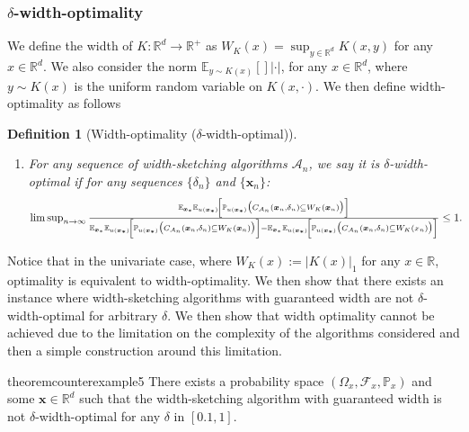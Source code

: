 \documentclass{article} %
\newtheorem{definition}{Definition}[section]
\theoremstyle{remark}
\theoremstyle{definition}      %
\begin{document}
\subsubsection{$\delta$-width-optimality}
We define the width of $K: \mathbb{R}^d \rightarrow \mathbb{R}^+$ as $W_{K}(x) = \sup_{y \in \mathbb{R}^d} K(x,y)$ for any $x \in \mathbb{R}^d$. We also consider the norm $\mathbb{E}_{y \sim K(x)}[]|\cdot|$, for any $x \in \mathbb{R}^d$, where $y \sim K(x)$ is the uniform random variable on $K(x,\cdot)$. We then define width-optimality as follows
\begin{definition}[Width-optimality ($\delta$-width-optimal)]
\begin{enumerate}[label=\arabic*),labelindent=0pt,itemsep=0pt,topsep=0pt]

\item For any sequence of width-sketching algorithms $\mathcal{A}_n$, we say it is 
\emph{$\delta$-width-optimal} if for any sequences $\{\delta_n\}$ and $\{\bm{x}_n\}$:
\begin{equation}
\resizebox{\linewidth}{!}{$
\limsup_{n \to \infty} 
\frac{
\mathbb{E}_{\bm{x}_*} \mathbb{E}_{u(\bm{x_*})}
\!\left[\mathbb{P}_{u(\bm{x_*})}
\big(C_{\mathcal{A}_n}(\bm{x}_n, \delta_n) \subseteq W_K(\bm{x}_n)\big)\right]
}{
\mathbb{E}_{\bm{x}_*} \mathbb{E}_{u(\bm{x_*})}
\!\left[\mathbb{P}_{u(\bm{x_*})}
\big(C_{\mathcal{A}_n}(\bm{x}_n, \delta_n) \subseteq W_K(\bm{x}_n)\big)\right]
-
\mathbb{E}_{\bm{x}_*} \mathbb{E}_{u(\bm{x_*})}
\!\left[\mathbb{P}_{u(\bm{x_*})}
\big(C_{\mathcal{A}_n}(\bm{x}_n, \delta_n) \subseteq W_K(x_n)\big)\right]
}
\le 1.$}
\end{equation}
\end{enumerate}
\end{definition}


Notice that in the univariate case, where $W_{K}(x) := |K(x)|_1$ for any $x \in \mathbb{R}$, optimality is equivalent to width-optimality. We then show that there exists an instance where width-sketching algorithms with guaranteed width are not $\delta$-width-optimal for arbitrary $\delta$. 
We then show that width optimality cannot be achieved due to the limitation on the complexity of the algorithms considered and then a simple construction around this limitation.
\begin{restatable}{theorem}{counterexample5}\label{prop:counterexample5}
  There exists a probability space $(\Omega_x, \mathcal{F}_x,\mathbb{P}_x)$ and some $\bm{x} \in \mathbb{R}^d$ such that the width-sketching algorithm with guaranteed width is not $\delta$-width-optimal for any $\delta$ in $[0.1,1]$. 
\end{restatable}
\end{document}
